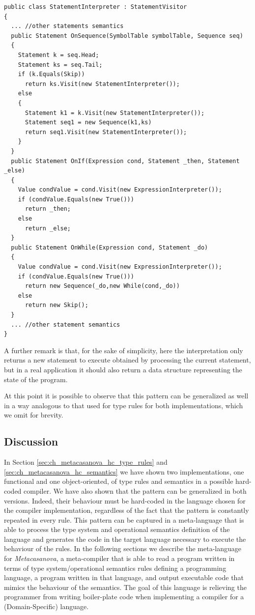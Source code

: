 \begin{lstlisting}
public class StatementInterpreter : StatementVisitor
{
  ... //other statements semantics
  public Statement OnSequence(SymbolTable symbolTable, Sequence seq)
  {
    Statement k = seq.Head;
    Statement ks = seq.Tail;
    if (k.Equals(Skip))
      return ks.Visit(new StatementInterpreter());
    else
    {
      Statement k1 = k.Visit(new StatementInterpreter());
      Statement seq1 = new Sequence(k1,ks)
      return seq1.Visit(new StatementInterpreter());
    }
  }
  public Statement OnIf(Expression cond, Statement _then, Statement _else)
  {
    Value condValue = cond.Visit(new ExpressionInterpreter());
    if (condValue.Equals(new True()))
      return _then;
    else
      return _else;
  }
  public Statement OnWhile(Expression cond, Statement _do)
  {
    Value condValue = cond.Visit(new ExpressionInterpreter());
    if (condValue.Equals(new True()))
      return new Sequence(_do,new While(cond,_do))
    else
      return new Skip();
  }
  ... //other statement semantics
}
\end{lstlisting}

A further remark is that, for the sake of simplicity, here the interpretation only returns a new statement to execute obtained by processing the current statement, but in a real application it should also return a data structure representing the state of the program.

At this point it is possible to observe that this pattern can be generalized as well in a way analogous to that used for type rules for both implementations, which we omit for brevity.


\subsection{Discussion}
In Section \ref{sec:ch_metacasanova_hc_type_rules} and \ref{sec:ch_metacasanova_hc_semantics} we have shown two implementations, one functional and one object-oriented, of type rules and semantics in a possible hard-coded compiler. We have also shown that the pattern can be generalized in both versions. Indeed, their behaviour must be hard-coded in the language chosen for the compiler implementation, regardless of the fact that the pattern is constantly repeated in every rule. This pattern can be captured in a meta-language that is able to process the type system and operational semantics definition of the language and generates the code in the target language necessary to execute the behaviour of the rules. In the following sections we describe the meta-language for \textit{Metacasanova}, a meta-compiler that is able to read a program written in terms of type system/operational semantics rules defining a programming language, a program written in that language, and output executable code that mimics the behaviour of the semantics. The goal of this language is relieving the programmer from writing boiler-plate code when implementing a compiler for a (Domain-Specific) language.

